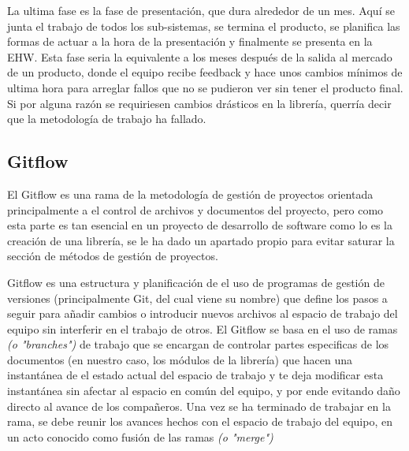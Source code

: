 \documentclass{report}
\begin{document}
La ultima fase es la fase de presentación, que dura alrededor de un mes. Aquí se junta el trabajo de todos los sub-sistemas, se termina el producto, se planifica las formas de actuar a la hora de la presentación y finalmente se presenta en la EHW. Esta fase seria la equivalente a los meses después de la salida al mercado de un producto, donde el equipo recibe feedback y hace unos cambios mínimos de ultima hora para arreglar fallos que no se pudieron ver sin tener el producto final. Si por alguna razón se requiriesen cambios drásticos en la librería, querría decir que la metodología de trabajo ha fallado. 

\subsection{Gitflow}
El Gitflow es una rama de la metodología de gestión de proyectos orientada principalmente a el control de archivos y documentos del proyecto, pero como esta parte es tan esencial en un proyecto de desarrollo de software como lo es la creación de una librería, se le ha dado un apartado propio para evitar saturar la sección de métodos de gestión de proyectos. 
\par \vspace{0.3 cm}
Gitflow es una estructura y planificación de el uso de programas de gestión de versiones (principalmente Git, del cual viene su nombre) que define los pasos a seguir para añadir cambios o introducir nuevos archivos al espacio de trabajo del equipo sin interferir en el trabajo de otros.
El Gitflow se basa en el uso de ramas \textit{(o "branches")} de trabajo que se encargan de controlar partes especificas de los documentos (en nuestro caso, los módulos de la librería) que hacen una instantánea de el estado actual del espacio de trabajo y te deja modificar esta instantánea sin afectar al espacio en común del equipo, y por ende evitando daño directo al avance de los compañeros. Una vez se ha terminado de trabajar en la rama, se debe reunir los avances hechos con el espacio de trabajo del equipo, en un acto conocido como fusión de las ramas \textit{(o "merge")}\par \vspace{0.3 cm}
\end{document}
